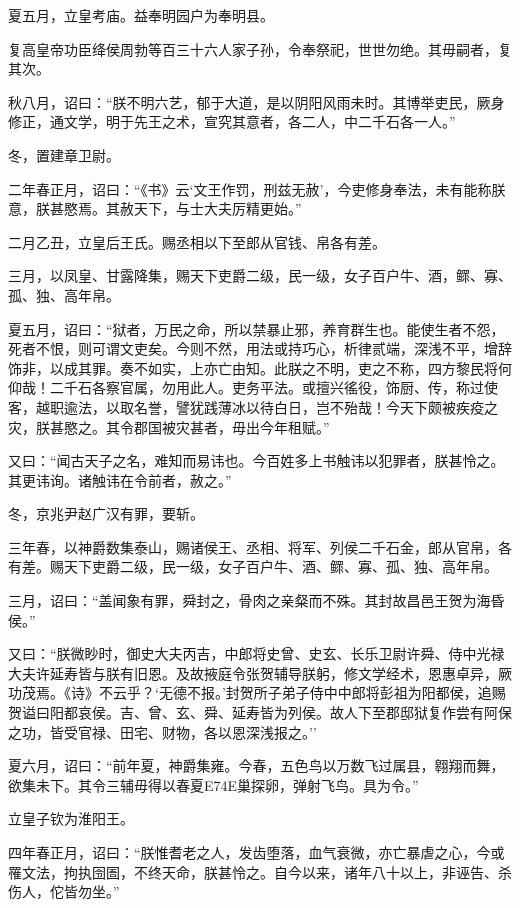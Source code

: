\documentclass[]{article}
\begin{document}
夏五月，立皇考庙。益奉明园户为奉明县。

复高皇帝功臣绛侯周勃等百三十六人家子孙，令奉祭祀，世世勿绝。其毋嗣者，复其次。

秋八月，诏曰：``朕不明六艺，郁于大道，是以阴阳风雨未时。其博举吏民，厥身修正，通文学，明于先王之术，宣究其意者，各二人，中二千石各一人。''

冬，置建章卫尉。

二年春正月，诏曰：``《书》云`文王作罚，刑兹无赦'，今吏修身奉法，未有能称朕意，朕甚愍焉。其赦天下，与士大夫厉精更始。''

二月乙丑，立皇后王氏。赐丞相以下至郎从官钱、帛各有差。

三月，以凤皇、甘露降集，赐天下吏爵二级，民一级，女子百户牛、酒，鳏、寡、孤、独、高年帛。

夏五月，诏曰：``狱者，万民之命，所以禁暴止邪，养育群生也。能使生者不怨，死者不恨，则可谓文吏矣。今则不然，用法或持巧心，析律贰端，深浅不平，增辞饰非，以成其罪。奏不如实，上亦亡由知。此朕之不明，吏之不称，四方黎民将何仰哉！二千石各察官属，勿用此人。吏务平法。或擅兴徭役，饰厨、传，称过使客，越职逾法，以取名誉，譬犹践薄冰以待白日，岂不殆哉！今天下颇被疾疫之灾，朕甚愍之。其令郡国被灾甚者，毋出今年租赋。''

又曰：``闻古天子之名，难知而易讳也。今百姓多上书触讳以犯罪者，朕甚怜之。其更讳询。诸触讳在令前者，赦之。''

冬，京兆尹赵广汉有罪，要斩。

三年春，以神爵数集泰山，赐诸侯王、丞相、将军、列侯二千石金，郎从官帛，各有差。赐天下吏爵二级，民一级，女子百户牛、酒、鳏、寡、孤、独、高年帛。

三月，诏曰：``盖闻象有罪，舜封之，骨肉之亲粲而不殊。其封故昌邑王贺为海昏侯。''

又曰：``朕微眇时，御史大夫丙吉，中郎将史曾、史玄、长乐卫尉许舜、侍中光禄大夫许延寿皆与朕有旧恩。及故掖庭令张贺辅导朕躬，修文学经术，恩惠卓异，厥功茂焉。《诗》不云乎？`无德不报。'封贺所子弟子侍中中郎将彭祖为阳都侯，追赐贺谥曰阳都哀侯。吉、曾、玄、舜、延寿皆为列侯。故人下至郡邸狱复作尝有阿保之功，皆受官禄、田宅、财物，各以恩深浅报之。''

夏六月，诏曰：``前年夏，神爵集雍。今春，五色鸟以万数飞过属县，翱翔而舞，欲集未下。其令三辅毋得以春夏E74E巢探卵，弹射飞鸟。具为令。''

立皇子钦为淮阳王。

四年春正月，诏曰：``朕惟耆老之人，发齿堕落，血气衰微，亦亡暴虐之心，今或罹文法，拘执囹圄，不终天命，朕甚怜之。自今以来，诸年八十以上，非诬告、杀伤人，佗皆勿坐。''
\end{document}
